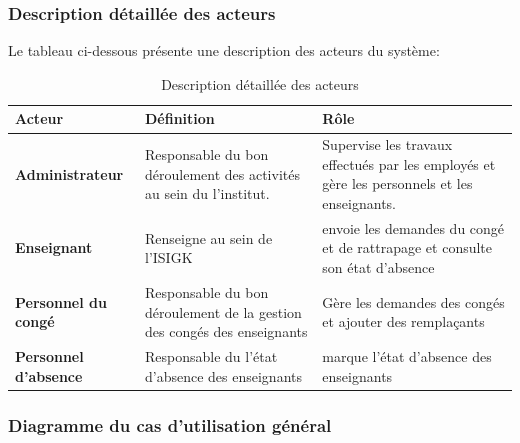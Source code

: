 \documentclass[12 pt ]{report}
\begin{document}
\subsubsection{Description détaillée des acteurs}
Le tableau ci-dessous présente une description des acteurs du système:
\begin{table}[htbp]
\begin{center}
\caption{Description détaillée des acteurs \label{table-nom}}
\renewcommand{\arraystretch}{1.8}
\begin{tabular}{|p{5cm}|p{5cm}|p{6cm}|} 
 
\hline 
\cellcolor{PaleTurquoise}\textbf{Acteur} &\cellcolor{PaleTurquoise} \textbf{Définition} &\cellcolor{PaleTurquoise} \textbf{Rôle} \\
\hline
\textbf{Administrateur} & Responsable du bon
déroulement des activités au sein du l'institut.& Supervise les travaux effectués
par les employés et gère les personnels et les enseignants.

 \\
\hline
\textbf{Enseignant}&Renseigne au sein de l'ISIGK&envoie les demandes du congé et de rattrapage et consulte son état d'absence \\
\hline
\textbf{Personnel du congé}& Responsable du bon déroulement de la gestion des congés  des enseignants&  Gère les demandes des congés et ajouter des remplaçants \\
\hline
\textbf{Personnel d'absence}&Responsable du l'état d'absence des enseignants&marque l'état d'absence des enseignants \\
\hline
\end{tabular}
\end{center}
\end{table}
\newpage

\subsubsection{Diagramme du cas d’utilisation général}
\end{document}
